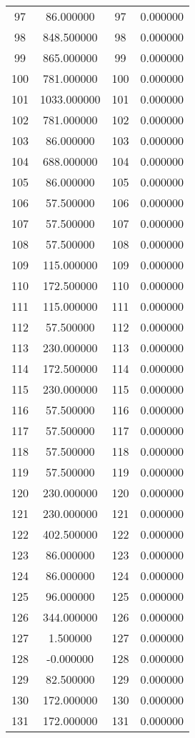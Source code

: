 \documentclass[12pt]{article}
\begin{document}
\begin{longtable}{@{}cccc@{}}
97 & 86.000000 & 97 & 0.000000 \\
98 & 848.500000 & 98 & 0.000000 \\
99 & 865.000000 & 99 & 0.000000 \\
100 & 781.000000 & 100 & 0.000000 \\
101 & 1033.000000 & 101 & 0.000000 \\
102 & 781.000000 & 102 & 0.000000 \\
103 & 86.000000 & 103 & 0.000000 \\
104 & 688.000000 & 104 & 0.000000 \\
105 & 86.000000 & 105 & 0.000000 \\
106 & 57.500000 & 106 & 0.000000 \\
107 & 57.500000 & 107 & 0.000000 \\
108 & 57.500000 & 108 & 0.000000 \\
109 & 115.000000 & 109 & 0.000000 \\
110 & 172.500000 & 110 & 0.000000 \\
111 & 115.000000 & 111 & 0.000000 \\
112 & 57.500000 & 112 & 0.000000 \\
113 & 230.000000 & 113 & 0.000000 \\
114 & 172.500000 & 114 & 0.000000 \\
115 & 230.000000 & 115 & 0.000000 \\
116 & 57.500000 & 116 & 0.000000 \\
117 & 57.500000 & 117 & 0.000000 \\
118 & 57.500000 & 118 & 0.000000 \\
119 & 57.500000 & 119 & 0.000000 \\
120 & 230.000000 & 120 & 0.000000 \\
121 & 230.000000 & 121 & 0.000000 \\
122 & 402.500000 & 122 & 0.000000 \\
123 & 86.000000 & 123 & 0.000000 \\
124 & 86.000000 & 124 & 0.000000 \\
125 & 96.000000 & 125 & 0.000000 \\
126 & 344.000000 & 126 & 0.000000 \\
127 & 1.500000 & 127 & 0.000000 \\
128 & -0.000000 & 128 & 0.000000 \\
129 & 82.500000 & 129 & 0.000000 \\
130 & 172.000000 & 130 & 0.000000 \\
131 & 172.000000 & 131 & 0.000000 \\

\end{longtable}
\end{document}
